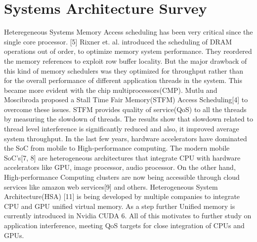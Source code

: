 \chapter{Systems Architecture Survey}
Heteregeneous Systems
Memory Access scheduling has been very critical since the single core processor. [5] Rixner et. al. introduced the scheduling of DRAM operations out of order, to optimize memory system performance. They reordered the memory references to exploit row buffer locality. But the major drawback of this kind of memory schedulers was they optimized for throughput rather than for the overall performance of different application threads in the system. This became more evident with the chip multiprocessors(CMP). Mutlu and Moscibroda proposed a Stall Time Fair Memory(STFM) Access Scheduling[4] to overcome these issues. STFM provides quality of service(QoS) to all the threads by measuring the slowdown of threads. The results show that slowdown related to thread level interference is significantly reduced and also, it improved average system throughput.\newline
In the last few years, hardware accelerators have dominated the SoC from mobile to High-performance computing. The modern mobile SoC’s[7, 8]  are heterogeneous architectures that integrate CPU with hardware accelerators like  GPU, image processor, audio processor. On the other hand, High-performance Computing clusters are now being accessible through cloud services like amazon web services[9] and others.  Heterogeneous System Architecture(HSA) [11] is being developed by multiple companies to integrate CPU and GPU unified virtual memory.  As a step further Unified memory is currently introduced in Nvidia CUDA 6. All of this motivates to further study on application interference, meeting QoS targets for close integration of CPUs and GPUs.\newline
